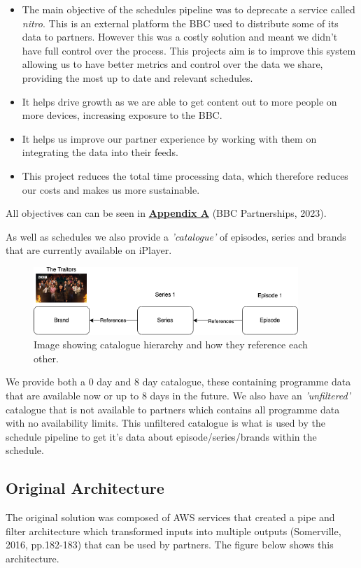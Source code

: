   \begin{itemize}
    \item The main objective of the schedules pipeline was to deprecate a service called \textit{nitro}. This is an external platform the BBC 
    used to distribute some of its data to partners. However this was a costly solution and meant we didn't have full control over the process. 
    This projects aim is to improve this system allowing us to have better metrics and control over the data we share, providing the most up to
    date and relevant schedules.
    \item It helps drive growth as we are able to get content out to more people on more devices, increasing exposure to the BBC.
    \item It helps us improve our partner experience by working with them on integrating the data into their feeds.
    \item This project reduces the total time processing data, which therefore reduces our costs and makes us more sustainable.
  \end{itemize}

  All objectives can can be seen in \hyperref[sec:AppendixA]{\textbf{Appendix A}} (BBC Partnerships, 2023).

  As well as schedules we also provide a \textit{'catalogue'} of episodes, series and brands that are currently available on iPlayer.

  \begin{figure}[H]
    \centering
    \includegraphics[width=10cm]{assets/catalogueHierarchy.drawio.png}
    \caption{Image showing catalogue hierarchy and how they reference each other.}
    \label{fig:catalogueHierarchy}
  \end{figure}
  
  We provide both a 0 day and 8 day catalogue, these containing programme data that are available now or up to 8 days in the future. We 
  also have an \textit{'unfiltered'} catalogue that is not available to partners which contains all programme data with no availability limits.
  This unfiltered catalogue is what is used by the schedule pipeline to get it's data about episode/series/brands within the schedule.

  \subsection{Original Architecture}
  The original solution was composed of AWS services that created a pipe and filter architecture which transformed inputs into multiple outputs 
  (Somerville, 2016, pp.182-183) that can be used by partners. The figure below shows this architecture.
  
